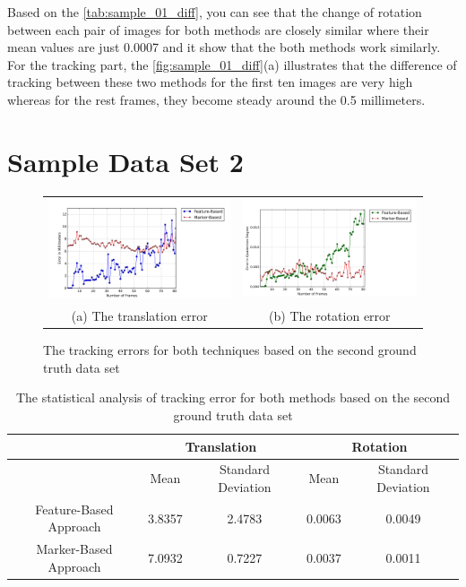 Based on the \autoref{tab:sample_01_diff}, you can see that the change of rotation between each pair of images for both methods are closely similar where their mean values are just 0.0007 and it show that the both methods work similarly. For the tracking part, the \autoref{fig:sample_01_diff}(a) illustrates that the difference of tracking between these two methods for the first ten images are very high whereas for the rest frames, they become steady around the 0.5 millimeters.

\section{Sample Data Set 2} \label{sec:sample_2}
\begin{figure}[H]
\begin{tabular}{cc}
  \includegraphics[width=80mm]{figures/frame_400/graph_translation} &  \includegraphics[width=80mm]{figures/frame_400/graph_rotation} \\
(a) The translation error & (b) The rotation error\\[6pt]
\end{tabular}
\caption{The tracking errors for both techniques based on the second ground truth data set}\label{fig:sample_02}
\end{figure}

\begin{table}[H]
\centering
  \begin{tabular}{| c || c | c | c | c |}
      \hline
       & \multicolumn{2}{c|}{Translation} & \multicolumn{2}{c|}{Rotation} \\ \hline
       & Mean & Standard Deviation & Mean & Standard Deviation \\ \hline
      Feature-Based Approach & 3.8357 & 2.4783 & 0.0063 & 0.0049 \\ \hline
      Marker-Based Approach & 7.0932 & 0.7227 & 0.0037 & 0.0011 \\ \hline
  \end{tabular}
  \caption{The statistical analysis of tracking error for both methods based on the second ground truth data set} \label{tab:sample_02}
\end{table}

